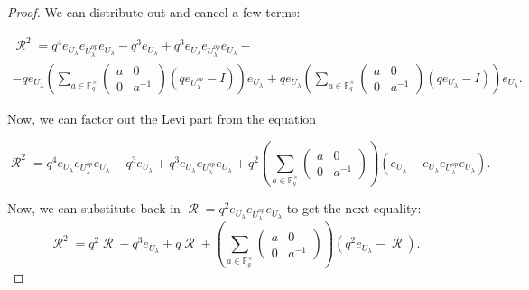\documentclass[10pt,a4paper]{amsart}
\DeclareMathOperator{\R}{\mathcal{R}}
\begin{document}
\begin{proof}
We can distribute out and cancel a few terms:%

\begin{multline*}
    \R^2 =  q^4e_{U_{\lambda}}e_{U_{\lambda}^{op}}e_{U_{\lambda}} - q^3 e_{U_{\lambda}} + q^3e_{U_{\lambda}}e_{U_{\lambda}^{op}}e_{U_{\lambda}} -\\- qe_{U_{\lambda}} \left( \sum_{a \in \mathbb{F}_q^\times} \begin{pmatrix}
    a & 0 \\
    0 & a^{-1}
    \end{pmatrix} (qe_{U_{\lambda}^{op}} - I)\right) e_{U_{\lambda}}+
     qe_{U_{\lambda}} \left(  \sum_{a \in \mathbb{F}_q^\times} \begin{pmatrix}
    a & 0 \\
    0 & a^{-1}
    \end{pmatrix} (qe_{U_{\lambda}} - I) \right) e_{U_{\lambda}}.
\end{multline*}

Now, we can factor out the Levi part from the equation

\begin{equation*}
     \R^2=  q^4e_{U_{\lambda}}e_{U_{\lambda}^{op}}e_{U_{\lambda}} - q^3 e_{U_{\lambda}} + q^3e_{U_{\lambda}}e_{U_{\lambda}^{op}}e_{U_{\lambda}} + q^2\left(  \sum_{a \in \mathbb{F}_q^\times} \begin{pmatrix}
    a & 0 \\
    0 & a^{-1}
    \end{pmatrix} \right) ( e_{U_{\lambda}} - e_{U_{\lambda}}e_{U_{\lambda}^{op}}e_{U_{\lambda}}).
\end{equation*}

Now, we can substitute back in $\R = q^2e_{U_{\lambda}}e_{U_{\lambda}^{op}}e_{U_{\lambda}}$ to get the next equality:
\begin{equation*}
    \R^2 =  q^2 \R - q^3 e_{U_{\lambda}} + q \R + \left(  \sum_{a \in \mathbb{F}_q^\times} \begin{pmatrix}
    a & 0 \\
    0 & a^{-1}
    \end{pmatrix} \right) ( q^2 e_{U_{\lambda}} - \R).
\end{equation*}


\end{proof}
\end{document}
